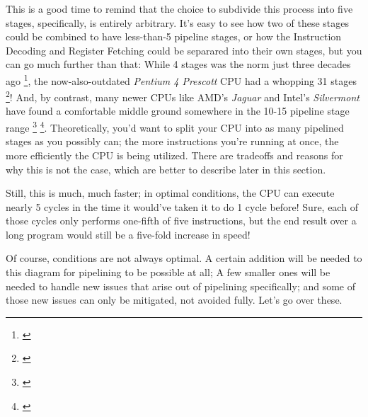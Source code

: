 \documentclass[12pt,twoside]{reedthesis}
\begin{document}
This is a good time to remind that the choice to subdivide this process into five stages, specifically, is entirely arbitrary. It's easy to see how two of these stages could be combined to have less-than-5 pipeline stages, or how the Instruction Decoding and Register Fetching could be separared into their own stages, but you can go much further than that: While 4 stages was the norm just three decades ago \footnote{\cite{denning}}, the now-also-outdated \textit{Pentium 4 Prescott} CPU had a whopping 31 stages \footnote{\cite{shimpi}}! And, by contrast, many newer CPUs like AMD's \textit{Jaguar} and Intel's \textit{Silvermont} have found a comfortable middle ground somewhere in the 10-15 pipeline stage range \footnote{\cite{kanter1}} \footnote{\cite{kanter2}}.  Theoretically, you'd want to split your CPU into as many pipelined stages as you possibly can; the more instructions you're running at once, the more efficiently the CPU is being utilized. There are tradeoffs and reasons for why this is not the case, which are better to describe later in this section.

Still, this is much, much faster;  in optimal conditions, the CPU can execute nearly 5 cycles in the time it would've taken it to do 1 cycle before! Sure, each of those cycles only performs one-fifth of five instructions, but the end result over a long program would still be a five-fold increase in speed!

Of course, conditions are not always optimal. A certain addition will be needed to this diagram for pipelining to be possible at all; A few smaller ones will be needed to handle new issues that arise out of pipelining specifically; and some of those new issues can only be mitigated, not avoided fully. Let's go over these.
\end{document}
